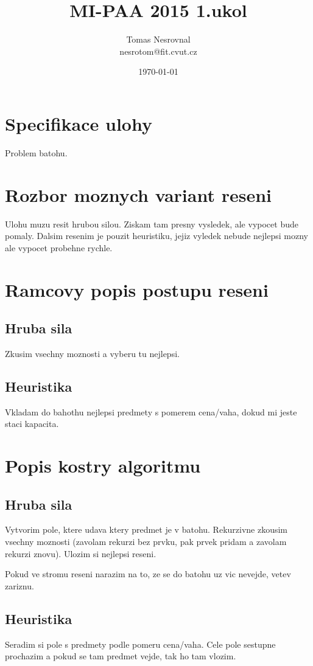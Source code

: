 \documentclass[12pt,a4paper]{article}
\begin{document}
\title{MI-PAA 2015 1.ukol}
\author{Tomas Nesrovnal\\nesrotom@fit.cvut.cz}
\date{\today}
\maketitle

\section{Specifikace ulohy}
Problem batohu.

\section{Rozbor moznych variant reseni}
Ulohu muzu resit hrubou silou. Ziskam tam presny vysledek, ale vypocet bude
pomaly. Dalsim resenim je pouzit heuristiku, jejiz vyledek nebude nejlepsi mozny
ale vypocet probehne rychle.

\section{Ramcovy popis postupu reseni}
\subsection{Hruba sila}
Zkusim vsechny moznosti a vyberu tu nejlepsi.
\subsection{Heuristika}
Vkladam do bahothu nejlepsi predmety s pomerem cena/vaha, dokud
mi jeste staci kapacita.

\section{Popis kostry algoritmu}
\subsection{Hruba sila}
Vytvorim pole, ktere udava ktery predmet je v batohu. Rekurzivne zkousim
vsechny moznosti (zavolam rekurzi bez prvku, pak prvek pridam a zavolam rekurzi znovu).
Ulozim si nejlepsi reseni.

Pokud ve stromu reseni narazim na to, ze se do batohu uz vic nevejde, vetev zariznu.
\subsection{Heuristika}
Seradim si pole s predmety podle pomeru cena/vaha. Cele pole sestupne prochazim a pokud se tam predmet vejde, tak ho tam vlozim.
\end{document}
